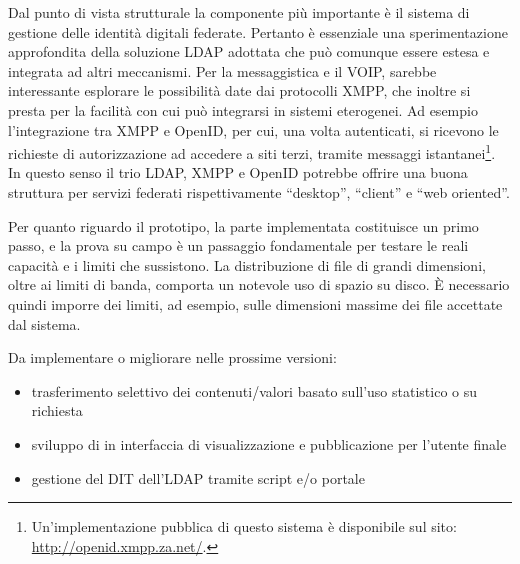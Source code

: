 Dal punto di vista strutturale la componente più importante è il
sistema di gestione delle identità digitali federate. Pertanto è
essenziale una sperimentazione approfondita della soluzione LDAP
adottata che può comunque essere estesa e integrata ad altri
meccanismi. Per la messaggistica e il VOIP, sarebbe interessante
esplorare le possibilità date dai protocolli XMPP, che inoltre si
presta per la facilità con cui può integrarsi in sistemi
eterogenei. Ad esempio l'integrazione tra XMPP e OpenID, per cui, una
volta autenticati, si ricevono le richieste di autorizzazione ad
accedere a siti terzi, tramite messaggi
istantanei\footnote{Un'implementazione pubblica di questo sistema è
  disponibile sul sito: \url{http://openid.xmpp.za.net/}.}. In questo
senso il trio LDAP, XMPP e OpenID potrebbe offrire una buona struttura
per servizi federati rispettivamente ``desktop'', ``client'' e ``web
oriented''.

Per quanto riguardo il prototipo, la parte implementata costituisce un
primo passo, e la prova su campo è un passaggio fondamentale per
testare le reali capacità e i limiti che sussistono. La distribuzione
di file di grandi dimensioni, oltre ai limiti di banda, comporta un
notevole uso di spazio su disco. È necessario quindi imporre dei
limiti, ad esempio, sulle dimensioni massime dei file accettate dal
sistema.

Da implementare o migliorare nelle prossime versioni:
\begin{itemize}
\item trasferimento selettivo dei contenuti/valori basato sull'uso
  statistico o su richiesta
\item sviluppo di in interfaccia di visualizzazione e pubblicazione
  per l'utente finale
\item gestione del DIT dell'LDAP tramite script e/o portale
\end{itemize}

